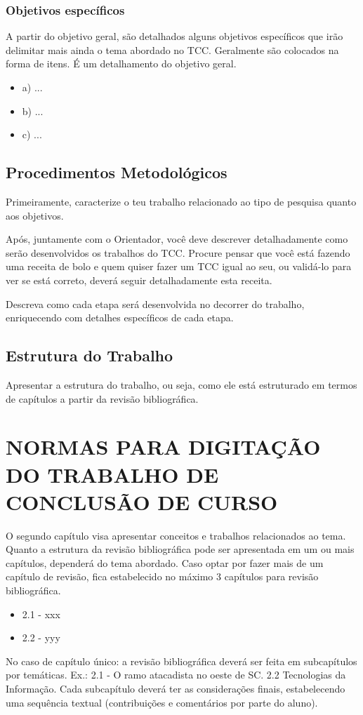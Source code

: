 \documentclass[pnumromarab, normaltoc, a4paper, 12pt]{abnt-unochapeco}
\begin{document}
\subsection{Objetivos específicos}
A partir do objetivo geral, são detalhados alguns objetivos específicos que irão
delimitar mais ainda o tema abordado no TCC. Geralmente são colocados na forma
de itens. É um detalhamento do objetivo geral.

\begin{itemize}
  \leading{5mm}
  \item [] a) ...
  \item [] b) ...
  \item [] c) ...
\end{itemize}

\section{Procedimentos Metodológicos}
Primeiramente, caracterize o teu trabalho relacionado ao tipo de pesquisa quanto
aos objetivos.

Após, juntamente com o Orientador, você deve descrever detalhadamente como serão
desenvolvidos os trabalhos do TCC. Procure pensar que você está fazendo uma
receita de bolo e quem quiser fazer um TCC igual ao seu, ou validá-lo para ver
se está correto, deverá seguir detalhadamente esta receita.

Descreva como cada etapa será desenvolvida no decorrer do trabalho, enriquecendo
com detalhes específicos de cada etapa.

\section{Estrutura do Trabalho}
Apresentar a estrutura do trabalho, ou seja, como ele está estruturado em
termos de capítulos a partir da revisão bibliográfica.

\chapter{NORMAS PARA DIGITAÇÃO DO TRABALHO DE CONCLUSÃO DE CURSO}
O segundo capítulo visa apresentar conceitos e trabalhos relacionados ao tema.
Quanto a estrutura da revisão bibliográfica pode ser apresentada em um ou mais
capítulos, dependerá do tema abordado. Caso optar por fazer mais de um capítulo
de revisão, fica estabelecido no máximo 3 capítulos para revisão bibliográfica.
\begin{itemize}
  \leading{5mm}
  \item [] 2.1 - xxx
  \item [] 2.2 - yyy
\end{itemize}
No caso de capítulo único: a revisão bibliográfica deverá ser feita em
subcapítulos por temáticas. Ex.: 2.1 - O ramo atacadista no oeste de SC. 2.2
Tecnologias da Informação. Cada subcapítulo deverá ter as considerações finais,
estabelecendo uma sequência textual (contribuições e comentários por parte do
aluno).
\end{document}
